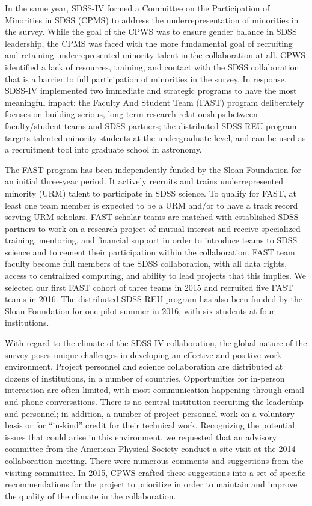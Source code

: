 In the same year, SDSS-IV formed a Committee on the Participation of
Minorities in SDSS (CPMS) to address the underrepresentation of
minorities in the survey.  While the goal of the CPWS was to ensure
gender balance in SDSS leadership, the CPMS was faced with the more
fundamental goal of recruiting and retaining underrepresented minority
talent in the collaboration at all. CPWS identified a lack of
resources, training, and contact with the SDSS collaboration that is a
barrier to full participation of minorities in the survey. In
response, SDSS-IV implemented two immediate and strategic programs to
have the most meaningful impact: the Faculty And Student Team (FAST)
program deliberately focuses on building serious, long-term research
relationships between faculty/student teams and SDSS partners; the
distributed SDSS REU program targets talented minority students at the
undergraduate level, and can be used as a recruitment tool into
graduate school in astronomy.

The FAST program has been independently funded by the Sloan Foundation
for an initial three-year period. It actively recruits and trains
underrepresented minority (URM) talent to participate in SDSS
science. To qualify for FAST, at least one team member is expected to
be a URM and/or to have a track record serving URM scholars.  FAST
scholar teams are matched with established SDSS partners to work on a
research project of mutual interest and receive specialized training,
mentoring, and financial support in order to introduce teams to SDSS
science and to cement their participation within the
collaboration. FAST team faculty become full members of the SDSS
collaboration, with all data rights, access to centralized computing,
and ability to lead projects that this implies. We selected our first
FAST cohort of three teams in 2015 and recruited five FAST teams in 2016.
The distributed SDSS REU program has also been funded by the Sloan
Foundation for one pilot summer in 2016, with six students at four
institutions.

With regard to the climate of the SDSS-IV collaboration, the global
nature of the survey poses unique challenges in developing an
effective and positive work environment.  Project personnel and
science collaboration are distributed at dozens of institutions, in a
number of countries. Opportunities for in-person interaction are
often limited, with most communication happening through email and
phone conversations. There is no central institution recruiting the
leadership and personnel; in addition, a number of project personnel
work on a voluntary basis or for ``in-kind'' credit for their
technical work. Recognizing the potential issues that could arise in
this environment, we requested that an advisory committee from the
American Physical Society conduct a site visit at the 2014
collaboration meeting. There were numerous comments and suggestions
from the visiting committee. In 2015, CPWS crafted these suggestions
into a set of specific recommendations for the project to prioritize
in order to maintain and improve the quality of the climate in the
collaboration.

